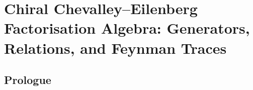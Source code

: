 
\providecommand{\SCchtop}{\mathsf{SC}^{\mathrm{ch},\mathrm{top}}}
\providecommand{\hCS}{\mathrm{hCS}}
\providecommand{\Obs}{\mathsf{Obs}}
\providecommand{\cA}{\mathcal{A}}
\providecommand{\cB}{\mathcal{B}}
\providecommand{\cE}{\mathcal{E}}
\providecommand{\cF}{\mathcal{F}}
\providecommand{\cL}{\mathcal{L}}
\providecommand{\cM}{\mathcal{M}}
\providecommand{\cO}{\mathcal{O}}
\providecommand{\cV}{\mathcal{V}}
\providecommand{\cW}{\mathcal{W}}
\providecommand{\cG}{\mathcal{G}}
\providecommand{\cH}{\mathcal{H}}
\providecommand{\cP}{\mathcal{P}}
\providecommand{\cR}{\mathcal{R}}
\providecommand{\cU}{\mathcal{U}}
\providecommand{\cD}{\mathcal{D}}
\providecommand{\fg}{\mathfrak{g}}
\providecommand{\fh}{\mathfrak{h}}
\providecommand{\fsl}{\mathfrak{sl}}
\providecommand{\fgl}{\mathfrak{gl}}
\providecommand{\dbar}{\bar\partial}
\providecommand{\CE}{\mathrm{CE}}
\providecommand{\BRST}{\mathrm{BRST}}
\providecommand{\MC}{\mathrm{MC}}
\providecommand{\Sym}{\mathrm{Sym}}
\providecommand{\id}{\mathrm{id}}
\providecommand{\Ran}{\mathrm{Ran}}
\providecommand{\Tr}{\mathrm{Tr}}
\providecommand{\Fact}{\mathrm{Fact}}
\providecommand{\End}{\mathrm{End}}
\providecommand{\Conf}{\mathrm{Conf}}
\providecommand{\Disk}{\mathrm{Disk}}
\providecommand{\Ainf}{A_\infty}
\providecommand{\Linf}{L_\infty}
\providecommand{\Fobs}{\mathbf{Obs}}
\providecommand{\Omegabar}{\Omega^{0,\bullet}}
\providecommand{\normord}[1]{:\!#1\!:}
\providecommand{\Res}{\operatorname{Res}}
\providecommand{\kappaChHodge}{\kappa_{\mathrm{ch}}^{\mathrm{Hodge}}}

\chapter{Chiral Chevalley--Eilenberg Factorisation Algebra:
Generators, Relations, and Feynman Traces}
\label{ch:chiral-ce-factalg-gen-rel}

\section*{Prologue}

